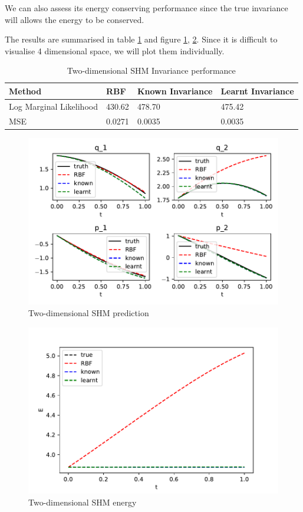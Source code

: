\documentclass{statsmsc}
\begin{document}
We can also assess its energy conserving performance since the true invariance will allows the energy to be conserved. 

The results are summarised in table \ref{tab:SHM_2d_performance} and figure \ref{fig:shm_2d_prediction}, \ref{fig:shm_2d_energy}.
Since it is difficult to visualise 4 dimensional space, we will plot them individually.

\begin{table}[H]
  \centering
  \begin{tabular}{l l l l}
    \hline
Method           & RBF & Known Invariance&  Learnt Invariance\\
  \hline
Log Marginal Likelihood & 430.62 & 478.70 & 475.42  \\
MSE & 0.0271 & 0.0035 & 0.0035 \\
                    \hline
  \end{tabular}
  \caption{Two-dimensional SHM Invariance performance}
  \label{tab:SHM_2d_performance}
\end{table}

\begin{figure}[H] 
  \includegraphics[width=0.8\linewidth]{../codes/figures/shm_2d_predicted.pdf}
  \centering
  \caption{Two-dimensional SHM prediction}
  \label{fig:shm_2d_prediction}
\end{figure}

\begin{figure}[H] 
  \includegraphics[width=0.8\linewidth]{../codes/figures/shm_2d_energy.pdf}
  \centering
  \caption{Two-dimensional SHM energy}
  \label{fig:shm_2d_energy}
\end{figure}
\end{document}

